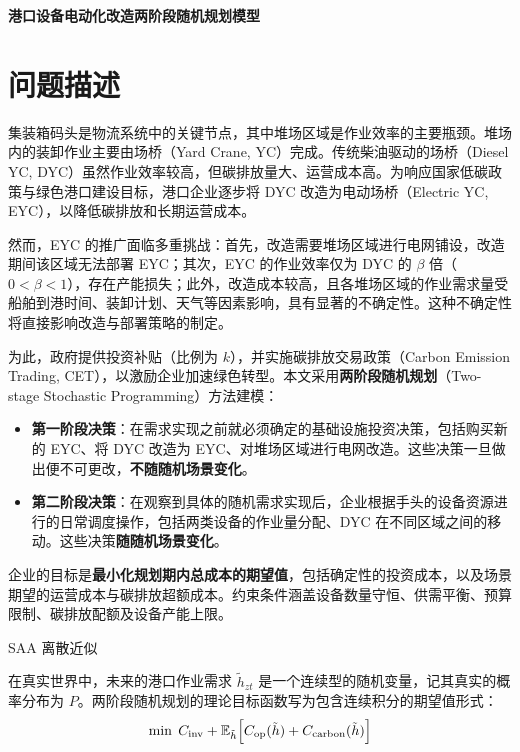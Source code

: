\documentclass[12pt,a4paper]{article}
\newcommand{\手批注}[2]{\textcolor{#1}{\text{\kaishu #2}}}
\newcommand{\一阶段}{\textcolor{firststage}{\text{\kaishu （一阶段）}}}
\newcommand{\二阶段}{\textcolor{secondstage}{\text{\kaishu （二阶段）}}}
\begin{document}
\begin{center}
    \Large\bfseries\heiti 港口设备电动化改造两阶段随机规划模型\\[0.8em]
    \normalsize\kaishu 
\end{center}

\section{问题描述}

集装箱码头是物流系统中的关键节点，其中堆场区域是作业效率的主要瓶颈。堆场内的装卸作业主要由场桥（Yard Crane, YC）完成。传统柴油驱动的场桥（Diesel YC, DYC）虽然作业效率较高，但碳排放量大、运营成本高。为响应国家低碳政策与绿色港口建设目标，港口企业逐步将 DYC 改造为电动场桥（Electric YC, EYC），以降低碳排放和长期运营成本。

然而，EYC 的推广面临多重挑战：首先，改造需要堆场区域进行电网铺设，改造期间该区域无法部署 EYC；其次，EYC 的作业效率仅为 DYC 的 $\beta$ 倍（$0<\beta<1$），存在产能损失；此外，改造成本较高，且各堆场区域的作业需求量受船舶到港时间、装卸计划、天气等因素影响，具有显著的不确定性。这种不确定性将直接影响改造与部署策略的制定。

为此，政府提供投资补贴（比例为 $k$），并实施碳排放交易政策（Carbon Emission Trading, CET），以激励企业加速绿色转型。本文采用\textbf{两阶段随机规划}（Two-stage Stochastic Programming）方法建模：
\begin{itemize}[itemsep=0.2em,leftmargin=2em]
    \item \textbf{第一阶段决策}：在需求实现之前就必须确定的基础设施投资决策，包括购买新的 EYC、将 DYC 改造为 EYC、对堆场区域进行电网改造。这些决策一旦做出便不可更改，\textbf{不随随机场景变化}。
    \item \textbf{第二阶段决策}：在观察到具体的随机需求实现后，企业根据手头的设备资源进行的日常调度操作，包括两类设备的作业量分配、DYC 在不同区域之间的移动。这些决策\textbf{随随机场景变化}。
\end{itemize}

企业的目标是\textbf{最小化规划期内总成本的期望值}，包括确定性的投资成本，以及场景期望的运营成本与碳排放超额成本。约束条件涵盖设备数量守恒、供需平衡、预算限制、碳排放配额及设备产能上限。

{SAA 离散近似}

在真实世界中，未来的港口作业需求 $\tilde{h}_{zt}$ 是一个连续型的随机变量，记其真实的概率分布为 $P$。两阶段随机规划的理论目标函数写为包含连续积分的期望值形式：
\begin{equation}
    \min \; C_{\text{inv}} + \mathbb{E}_{\tilde{h}} \Bigl[ C_{\text{op}}(\tilde{h}) + C_{\text{carbon}}(\tilde{h}) \Bigr]
    \label{eq:continuous-expectation}
\end{equation}
\end{document}
